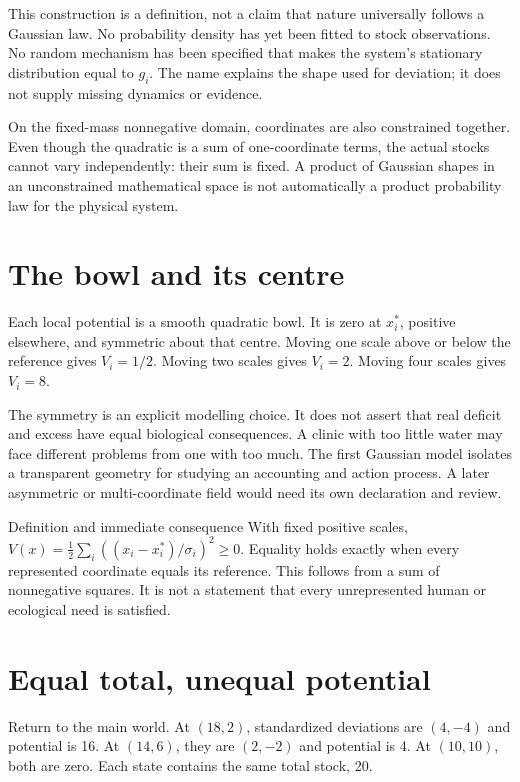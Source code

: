 This construction is a definition, not a claim that nature universally follows a Gaussian law. No probability density has yet been fitted to stock observations. No random mechanism has been specified that makes the system's stationary distribution equal to \(g_i\). The name explains the shape used for deviation; it does not supply missing dynamics or evidence.

On the fixed-mass nonnegative domain, coordinates are also constrained together. Even though the quadratic is a sum of one-coordinate terms, the actual stocks cannot vary independently: their sum is fixed. A product of Gaussian shapes in an unconstrained mathematical space is not automatically a product probability law for the physical system.


\section{The bowl and its centre}
Each local potential is a smooth quadratic bowl. It is zero at \(x_i^*\), positive elsewhere, and symmetric about that centre. Moving one scale above or below the reference gives \(V_i=1/2\). Moving two scales gives \(V_i=2\). Moving four scales gives \(V_i=8\).

The symmetry is an explicit modelling choice. It does not assert that real deficit and excess have equal biological consequences. A clinic with too little water may face different problems from one with too much. The first Gaussian model isolates a transparent geometry for studying an accounting and action process. A later asymmetric or multi-coordinate field would need its own declaration and review.

\begin{lawbox}{Definition and immediate consequence}
With fixed positive scales, \(V(x)=\tfrac12\sum_i((x_i-x_i^*)/\sigma_i)^2\geq0\). Equality holds exactly when every represented coordinate equals its reference. This follows from a sum of nonnegative squares. It is not a statement that every unrepresented human or ecological need is satisfied.
\end{lawbox}

\section{Equal total, unequal potential}
Return to the main world. At \((18,2)\), standardized deviations are \((4,-4)\) and potential is 16. At \((14,6)\), they are \((2,-2)\) and potential is 4. At \((10,10)\), both are zero. Each state contains the same total stock, 20.

